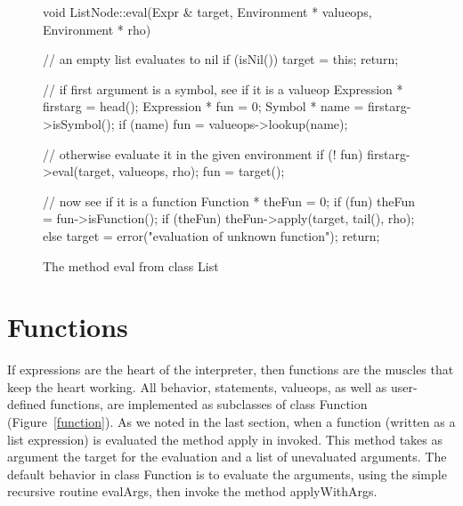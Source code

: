 \begin{figure}
\begin{cprog}
void ListNode::eval(Expr & target, Environment * valueops, Environment * rho)
{

	// an empty list evaluates to nil
	if (isNil()) {
		target = this;
		return;
		}

	// if first argument is a symbol, see if it is a valueop
	Expression * firstarg = head();
	Expression * fun = 0;
	Symbol * name = firstarg->isSymbol();
	if (name) 
		fun = valueops->lookup(name);

	// otherwise evaluate it in the given environment
	if (! fun)  {
		firstarg->eval(target, valueops, rho);
		fun = target();
		}

	// now see if it is a function
	Function * theFun = 0;
	if (fun) theFun = fun->isFunction();
	if (theFun) { 
		theFun->apply(target, tail(), rho);
		}
	else {
		target = error("evaluation of unknown function");
		return;
		}
}
\end{cprog}
\caption{The method {\sf eval} from class {\sf List}}\label{listeval}
\end{figure}

\section{Functions}

If expressions are the heart of the interpreter, then functions are the 
muscles that keep the heart working.  All behavior, statements, valueops,
as well as user-defined functions, are implemented as subclasses of 
class {\sf Function} (Figure~\ref{function}).
As we noted in the last section, when a function (written as a list
expression) is evaluated the method {\sf apply} in invoked.
This method takes as argument the target for the evaluation and a list of
unevaluated arguments.  The default behavior in class {\sf Function} is to
evaluate the arguments, using the simple recursive routine {\sf evalArgs},
then invoke the method {\sf applyWithArgs}.

